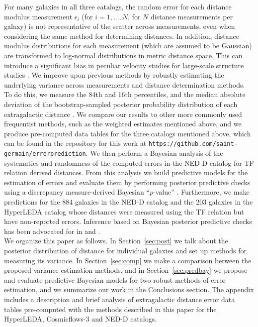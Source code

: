 \documentclass[a4paper,fleqn,usenatbib]{mnras}
\begin{document}
For many galaxies in all three catalogs, the random error for each distance modulus measurement $\epsilon_i$ (for $i=1,...,N$, for $N$ distance measurements per galaxy) is not representative of the scatter across measurements, even when considering the same method for determining distances. In addition, distance modulus distributions for each measurement (which are assumed to be Gaussian) are transformed to log-normal distributions in metric distance space. This can introduce a significant bias in peculiar velocity studies for large-scale structure studies \citep{lognormal}. We improve upon previous methods by robustly estimating the underlying variance across measurements and distance determination methods. To do this, we measure the 84th and 16th percentiles, and the median absolute deviation of the bootstrap-sampled posterior probability distribution of each extragalactic distance \citep{chaparro18}. We compare our results to other more commonly used frequentist methods, such as the weighted estimates mentioned above, and we produce pre-computed data tables for the three catalogs mentioned above, which can be found in the repository for this work at \texttt{https://github.com/saint-germain/errorprediction}. We then perform a Bayesian analysis of the systematics and randomness of the computed errors in the NED-D catalog for TF relation derived distances. From this analysis we build predictive models for the estimation of errors and evaluate them by performing posterior predictive checks using a discrepancy measure-derived Bayesian ``$p$-value'' \citep{gelmanppd}. Furthermore, we make predictions for the 884 galaxies in the NED-D catalog and the 203 galaxies in the HyperLEDA catalog whose distances were measured using the TF relation but have non-reported errors. Inference based on Bayesian posterior predictive checks has been advocated for in \citet{gelman2003} and \citet{ppcinf}.\\

We organize this paper as follows. In Section~\ref{sec:post} we talk about the posterior distribution of distance for individual galaxies and set up methods for measuring its variance. In Section~\ref{sec:comp} we make a comparison between the proposed variance estimation methods, and in Section~\ref{sec:predbay} we propose and evaluate predictive Bayesian models for two robust methods of error estimation, and we summarize our work in the Conclusions section. The appendix includes a description and brief analysis of extragalactic distance error data tables pre-computed with the methods described in this paper for the HyperLEDA, Cosmicflows-3 and NED-D catalogs.
\end{document}
